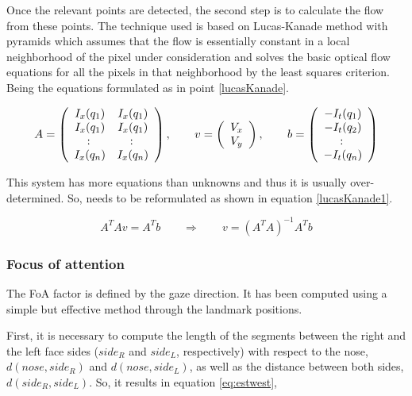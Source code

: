 \documentclass[a4paper, 10pt, conference]{ieeeconf}      %
\begin{document}
Once the relevant points are detected, the second step is to calculate the flow from these points. The technique used is based on Lucas-Kanade method with pyramids\cite{bouguet2001pyramidal} which assumes that the flow is essentially constant in a local neighborhood of the pixel under consideration and solves the basic optical flow equations for all the pixels in that neighborhood by the least squares criterion. Being the equations formulated as in point \ref{lucasKanade}.

\begin{equation} \label{lucasKanade}
\resizebox{.9\hsize}{!}{$A =  \left( \begin{array}{cc}
	I_x(q_1) & I_x(q_1) \\
	I_x(q_1) & I_x(q_1) \\
	\colon & \colon  \\
	I_x(q_n) & I_x(q_n)
	\end{array} \right),
\qquad  
v =  \left( \begin{array}{cc}
		V_x  \\
		V_y \\
	\end{array} \right),
\qquad	 	 
b =  \left( \begin{array}{c}
	 		-I_t(q_1)\\
	 		-I_t(q_2)\\
	 		\colon \\
	 		-I_t(q_n)\\
	 \end{array} \right)$}
\end{equation}

This system has more equations than unknowns and thus it is usually over-determined. So, needs to be reformulated as shown in equation \ref{lucasKanade1}. 

\begin{equation} \label{lucasKanade1}
A^TAv = A^Tb
\qquad
\Rightarrow
\qquad
v=(A^TA)^{-1}A^Tb
\end{equation}

\subsubsection{Focus of attention}
The FoA factor is defined by the gaze direction. It has been computed using a simple but effective method through the landmark positions.

First, it is necessary to compute the length of the segments between the right and the left face sides ($ side_R $ and $ side_L $, respectively) with respect to the nose, $ d(nose,side_R) $ and $ d(nose,side_L) $, as well as the distance between both sides, $ d(side_R,side_L) $. So, it results in equation \ref{eq:estwest},
\end{document}
